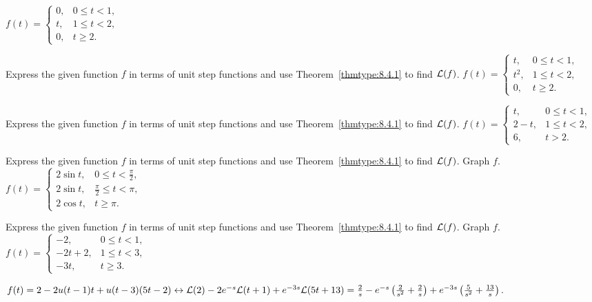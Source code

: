 \documentclass{ximera}
\begin{document}
\begin{problem}\label{exer:8.4.12} $f(t)=\left\{\begin{array}{cl} 0,&0 \le
t<1,\\ t,&1\le t<2,\\ 0,&t\ge2.\end{array}\right.$
\end{problem}

\begin{problem}\label{exer:8.4.13} 
 Express the
given function $f$ in terms of unit step functions
 and use Theorem~\ref{thmtype:8.4.1} to find ${\cal L}(f)$.
 $f(t)=\left\{\begin{array}{cl} t,&0 \le
t<1,\\ t^2,&1\le t<2,\\ 0,&t\ge2. \end{array}\right.$
\end{problem}

 \begin{problem}\label{exer:8.4.14} 
 Express the
given function $f$ in terms of unit step functions
 and use Theorem~\ref{thmtype:8.4.1} to find ${\cal L}(f)$.
 $f(t)=\left\{\begin{array}{cl} t,&0\le
t<1,\\ 2-t,&1\le t<2,\\ 6,&t > 2. \end{array}\right.$
\end{problem}

\begin{problem}\label{exer:8.4.15} 
Express the given function $f$ in terms of unit step functions and use Theorem~\ref{thmtype:8.4.1} to find ${\cal L}(f)$.  Graph $f$.
 $f(t)=\left\{\begin{array}{cl}
2
\sin t,&0\le t<\frac{\pi}{2},\\ 2\sin t,&
\frac{\pi}{2}\le t<\pi,\\ 2\cos t,
&t\ge\pi.\end{array}\right.$
\end{problem}

\begin{problem}\label{exer:8.4.16} Express the given function $f$ in terms of unit step functions and use Theorem~\ref{thmtype:8.4.1} to find ${\cal L}(f)$.  Graph $f$.
$f(t)=\left\{\begin{array}{cl}- 2,&0\le
t<1,\\ -2t+2,&1\le t<3,\\ -3t,&t\ge
3.\end{array}\right.$

\begin{solution}
$f(t)=2-2u(t-1)t+u(t-3)(5t-2)
\leftrightarrow {\cal L}(2)-2e^{-s}{\cal L}(t+1)+e^{-3s}{\cal
L}(5t+13)=
\frac{2}{s}-e^{-s}\left(\frac{2}{s^2}+\frac{2}{s}\right)+e^{-3s}\left(\frac{5}{s^2}+\frac{13}{s}\right)$.
\end{solution}
\end{problem}
\end{document}
